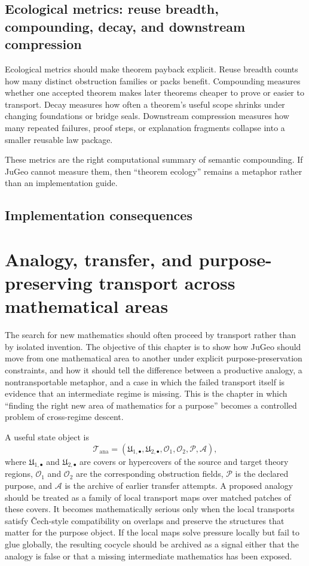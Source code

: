 \documentclass[11pt]{report}
\begin{document}
\section{Ecological metrics: reuse breadth, compounding, decay, and downstream compression}
Ecological metrics should make theorem payback explicit. Reuse breadth counts how many distinct obstruction families or packs benefit. Compounding measures whether one accepted theorem makes later theorems cheaper to prove or easier to transport. Decay measures how often a theorem's useful scope shrinks under changing foundations or bridge seals. Downstream compression measures how many repeated failures, proof steps, or explanation fragments collapse into a smaller reusable law package.

These metrics are the right computational summary of semantic compounding. If JuGeo cannot measure them, then “theorem ecology” remains a metaphor rather than an implementation guide.

\section{Implementation consequences}
\chapter{Analogy, transfer, and purpose-preserving transport across mathematical areas}
The search for new mathematics should often proceed by transport rather than by isolated invention. The objective of this chapter is to show how JuGeo should move from one mathematical area to another under explicit purpose-preservation constraints, and how it should tell the difference between a productive analogy, a nontransportable metaphor, and a case in which the failed transport itself is evidence that an intermediate regime is missing. This is the chapter in which ``finding the right new area of mathematics for a purpose'' becomes a controlled problem of cross-regime descent.

A useful state object is
\[
\mathcal{T}_{\mathrm{ana}} = (\mathfrak{U}_{1,\bullet},\mathfrak{U}_{2,\bullet},\mathcal{O}_{1},\mathcal{O}_{2},\mathcal{P},\mathcal{A}),
\]
where $\mathfrak{U}_{1,\bullet}$ and $\mathfrak{U}_{2,\bullet}$ are covers or hypercovers of the source and target theory regions, $\mathcal{O}_{1}$ and $\mathcal{O}_{2}$ are the corresponding obstruction fields, $\mathcal{P}$ is the declared purpose, and $\mathcal{A}$ is the archive of earlier transfer attempts. A proposed analogy should be treated as a family of local transport maps over matched patches of these covers. It becomes mathematically serious only when the local transports satisfy \v{C}ech-style compatibility on overlaps and preserve the structures that matter for the purpose object. If the local maps solve pressure locally but fail to glue globally, the resulting cocycle should be archived as a signal either that the analogy is false or that a missing intermediate mathematics has been exposed.
\end{document}

